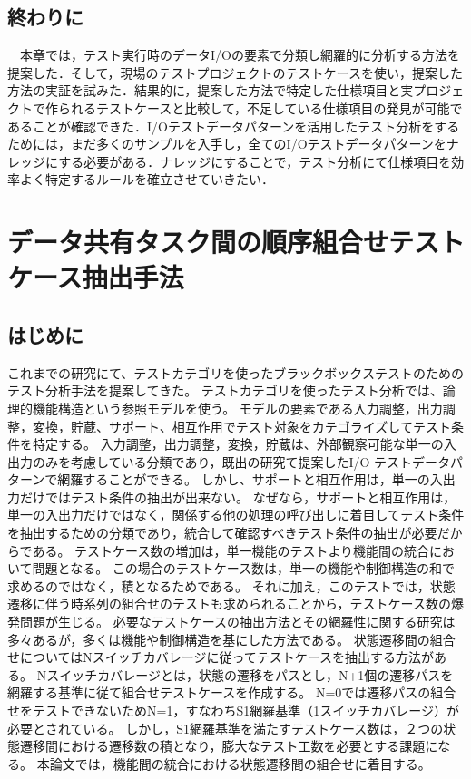 \documentclass[a4paper,12pt]{jreport}
\begin{document}
\section{終わりに}
　本章では，テスト実行時のデータI/Oの要素で分類し網羅的に分析する方法を提案した．そして，現場のテストプロジェクトのテストケースを使い，提案した方法の実証を試みた．結果的に，提案した方法で特定した仕様項目と実プロジェクトで作られるテストケースと比較して，不足している仕様項目の発見が可能であることが確認できた．I/Oテストデータパターンを活用したテスト分析をするためには，まだ多くのサンプルを入手し，全てのI/Oテストデータパターンをナレッジにする必要がある．ナレッジにすることで，テスト分析にて仕様項目を効率よく特定するルールを確立させていきたい．


\chapter{データ共有タスク間の順序組合せテストケース抽出手法}

\section{はじめに}
これまでの研究にて、テストカテゴリを使ったブラックボックステストのためのテスト分析手法を提案してきた。
テストカテゴリを使ったテスト分析では、論理的機能構造という参照モデルを使う。
モデルの要素である入力調整，出力調整，変換，貯蔵、サポート、相互作用でテスト対象をカテゴライズしてテスト条件を特定する。
入力調整，出力調整，変換，貯蔵は、外部観察可能な単一の入出力のみを考慮している分類であり，既出の研究て提案したI/O テストデータパターンで網羅することができる。
しかし、サポートと相互作用は，単一の入出力だけではテスト条件の抽出が出来ない。
なぜなら，サポートと相互作用は，単一の入出力だけではなく，関係する他の処理の呼び出しに着目してテスト条件を抽出するための分類であり，統合して確認すべきテスト条件の抽出が必要だからである。
テストケース数の増加は，単一機能のテストより機能間の統合において問題となる。
この場合のテストケース数は，単一の機能や制御構造の和で求めるのではなく，積となるためである。
それに加え，このテストでは，状態遷移に伴う時系列の組合せのテストも求められることから，テストケース数の爆発問題が生じる。
必要なテストケースの抽出方法とその網羅性に関する研究は多々あるが，多くは機能や制御構造を基にした方法である\cite{Myers,Lee,Grinda,Ostrand}。
状態遷移間の組合せについてはNスイッチカバレージに従ってテストケースを抽出する方法がある。
Nスイッチカバレージとは，状態の遷移をパスとし，N+1個の遷移パスを網羅する基準に従て組合せテストケースを作成する。
N=0では遷移パスの組合せをテストできないためN=1，すなわちS1網羅基準（1スイッチカバレージ）が必要とされている\cite{Beizer}。
しかし，S1網羅基準を満たすテストケース数は，２つの状態遷移間における遷移数の積となり，膨大なテスト工数を必要とする課題になる。
本論文では，機能間の統合における状態遷移間の組合せに着目する。
\end{document}
